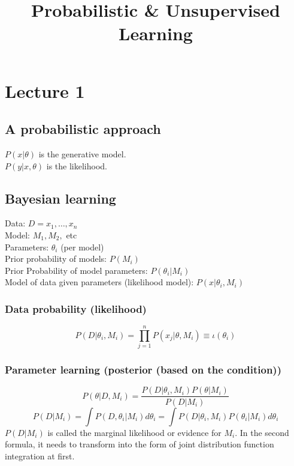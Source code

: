 \documentclass[12pt,a4paper]{article}
\title{Probabilistic \& Unsupervised Learning}
\begin{document}
 

\baselineskip24pt
\maketitle 

\section{Lecture 1}

\subsection{A probabilistic approach}
$P(x|\theta)$ is the generative model.\\
$P(y|x,\theta)$ is the likelihood.
\subsection{Bayesian learning}
Data: $D = {x_1,\ldots,x_n}$\\
Model: $M_1,M_2,$ etc \\
Parameters: $\theta_i$ (per model)\\
Prior probability of models: $P(M_i)$\\
Prior Probability of model parameters: $P(\theta_i|M_i)$\\
Model of data given parameters (likelihood model): $P(x|\theta_i,M_i)$
\subsubsection*{Data probability (likelihood)}
$$P(D|\theta_i,M_i) = \prod_{j=1}^{n}P(x_j|\theta,M_i)\equiv \iota(\theta_i)$$   %
\subsubsection*{Parameter learning (posterior (based on the condition))}
$$
P(\theta|D,M_i) = \frac{P(D|\theta_i,M_i)P(\theta|M_i)}{P(D|M_i)}
$$
$$
P(D|M_i) = \int{P(D,\theta_i|M_i)}d\theta_i = \int{P(D|\theta_i,M_i)P(\theta_i|M_i)}d\theta_i
$$
$P(D|M_i)$ is called the marginal likelihood or evidence for $M_i$. In the second formula, it needs to transform into the form of joint distribution function integration at first.
\end{document}
